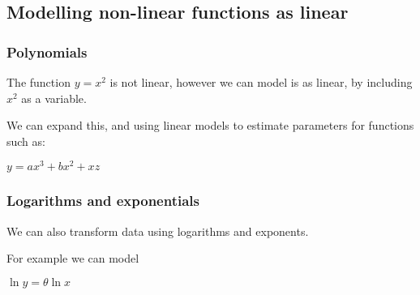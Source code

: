 
\subsection{Modelling non-linear functions as linear}

\subsubsection{Polynomials}

The function \(y=x^2\) is not linear, however we can model is as linear, by including \(x^2\) as a variable.

We can expand this, and using linear models to estimate parameters for functions such as:

\(y=ax^3+bx^2+xz\)

\subsubsection{Logarithms and exponentials}

We can also transform data using logarithms and exponents.

For example we can model

\(\ln y=\theta \ln x\)

